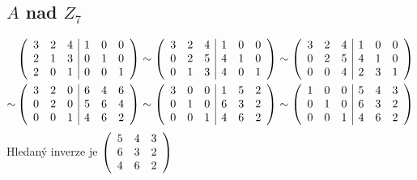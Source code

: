 \documentclass[a4paper]{article}
\begin{document}
\subsection{$A$ nad $Z_7$}%
\begin{align*}
    &\left(
    \begin{array}{c c c | c c c }
        3 & 2 & 4 & 1 & 0 & 0 \\
        2 & 1 & 3 & 0 & 1 & 0 \\
        2 & 0 & 1 & 0 & 0 & 1
    \end{array}
    \right)
    \sim
    \left(
    \begin{array}{c c c | c c c }
        3 & 2 & 4 & 1 & 0 & 0 \\
        0 & 2 & 5 & 4 & 1 & 0 \\
        0 & 1 & 3 & 4 & 0 & 1
    \end{array}
    \right)
    \sim
    \left(
    \begin{array}{c c c | c c c }
        3 & 2 & 4 & 1 & 0 & 0 \\
        0 & 2 & 5 & 4 & 1 & 0 \\
        0 & 0 & 4 & 2 & 3 & 1
    \end{array}
    \right)\\
    \sim
    &\left(
    \begin{array}{c c c | c c c }
        3 & 2 & 0 & 6 & 4 & 6 \\
        0 & 2 & 0 & 5 & 6 & 4 \\
        0 & 0 & 1 & 4 & 6 & 2
    \end{array}
    \right)
    \sim
    \left(
    \begin{array}{c c c | c c c }
        3 & 0 & 0 & 1 & 5 & 2 \\
        0 & 1 & 0 & 6 & 3 & 2 \\
        0 & 0 & 1 & 4 & 6 & 2
    \end{array}
    \right)
    \sim
    \left(
    \begin{array}{c c c | c c c }
        1 & 0 & 0 & 5 & 4 & 3 \\
        0 & 1 & 0 & 6 & 3 & 2 \\
        0 & 0 & 1 & 4 & 6 & 2
    \end{array}
    \right)
\end{align*}
Hledaný inverze je
$
\left(
\begin{array}{c c c}
    5 & 4 & 3 \\
    6 & 3 & 2 \\
    4 & 6 & 2
\end{array}
\right)
$\\
\end{document}

